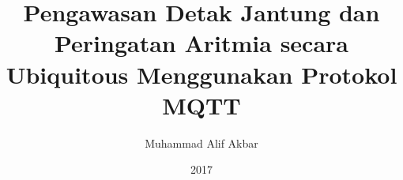 \documentclass[a4paper,12pt,oneside]{book}
\title{Pengawasan Detak Jantung dan Peringatan Aritmia secara Ubiquitous Menggunakan Protokol MQTT}\let\Title\@title   %
\author{Muhammad Alif Akbar}  \let\Author\@author  %
\date{2017}           \let\Date\@date %
\newif\iflogTA
\begin{document}
\begin{titlepage}
\thispagestyle{empty}

\pagebreak
\thispagestyle{empty}

\pagebreak
\end{titlepage}

\iflogTA
\pagebreak
\addcontentsline{toc}{chapter}{Abstract}

\pagebreak
\addcontentsline{toc}{chapter}{Lembar Persembahan}

\pagebreak
\addcontentsline{toc}{chapter}{Kata Pengantar}

\pagebreak
\fi
\cleardoublepage
{}
\tableofcontents
\iflogTA
\newpage
\cleardoublepage
\addcontentsline{toc}{chapter}{Daftar Gambar}
\listoffigures
\newpage
\cleardoublepage
\addcontentsline{toc}{chapter}{Daftar Tabel}
\listoftables
\fi
%
\cleardoublepage
{}

%

%

%
%
%
%
%
\cleardoublepage
{}

%
\cleardoublepage
{}

\end{document}
